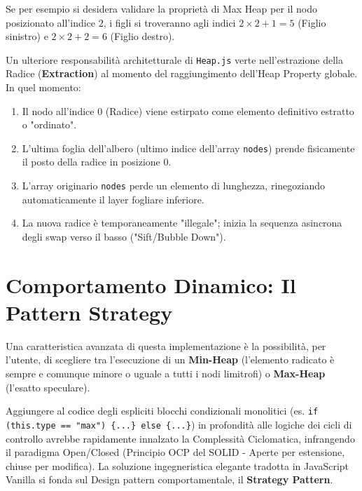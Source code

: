 \documentclass[openany]{theme/uniprthesis}
\begin{document}
Se per esempio si desidera validare la proprietà di Max Heap per il nodo posizionato all'indice $2$, i figli si troveranno agli indici $2 \times 2 + 1 = 5$ (Figlio sinistro) e $2 \times 2 + 2 = 6$ (Figlio destro).

Un ulteriore responsabilità architetturale di \texttt{Heap.js} verte nell'estrazione della Radice (\textbf{Extraction}) al momento del raggiungimento dell'Heap Property globale. In quel momento:
\begin{enumerate}
    \item Il nodo all'indice 0 (Radice) viene estirpato come elemento definitivo estratto o "ordinato".
    \item L'ultima foglia dell'albero (ultimo indice dell'array \texttt{nodes}) prende fisicamente il posto della radice in posizione 0.
    \item L'array originario \texttt{nodes} perde un elemento di lunghezza, rinegoziando automaticamente il layer fogliare inferiore.
    \item La nuova radice è temporaneamente "illegale"; inizia la sequenza asincrona degli swap verso il basso ("Sift/Bubble Down").
\end{enumerate}

\section{Comportamento Dinamico: Il Pattern Strategy}
Una caratteristica avanzata di questa implementazione è la possibilità, per l'utente, di scegliere tra l'esecuzione di un \textbf{Min-Heap} (l'elemento radicato è sempre e comunque minore o uguale a tutti i nodi limitrofi) o \textbf{Max-Heap} (l'esatto speculare). 

Aggiungere al codice degli espliciti blocchi condizionali monolitici (es. \texttt{if (this.type == "max") \{...\} else \{...\}}) in profondità alle logiche dei cicli di controllo avrebbe rapidamente innalzato la Complessità Ciclomatica, infrangendo il paradigma Open/Closed (Principio OCP del SOLID - Aperte per estensione, chiuse per modifica).
La soluzione ingegneristica elegante tradotta in JavaScript Vanilla si fonda sul Design pattern comportamentale, il \textbf{Strategy Pattern}.
\end{document}

